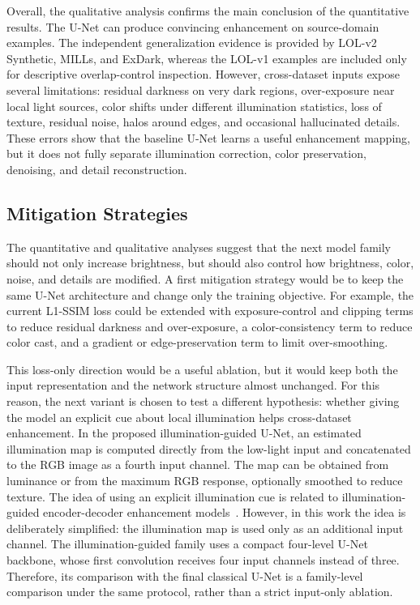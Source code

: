 Overall, the qualitative analysis confirms the main conclusion of the quantitative results. The U-Net can produce convincing enhancement on source-domain examples. The independent generalization evidence is provided by LOL-v2 Synthetic, MILLs, and ExDark, whereas the LOL-v1 examples are included only for descriptive overlap-control inspection. However, cross-dataset inputs expose several limitations: residual darkness on very dark regions, over-exposure near local light sources, color shifts under different illumination statistics, loss of texture, residual noise, halos around edges, and occasional hallucinated details. These errors show that the baseline U-Net learns a useful enhancement mapping, but it does not fully separate illumination correction, color preservation, denoising, and detail reconstruction.

\subsection{Mitigation Strategies}

The quantitative and qualitative analyses suggest that the next model family should not only increase brightness, but should also control how brightness, color, noise, and details are modified. A first mitigation strategy would be to keep the same U-Net architecture and change only the training objective. For example, the current L1-SSIM loss could be extended with exposure-control and clipping terms to reduce residual darkness and over-exposure, a color-consistency term to reduce color cast, and a gradient or edge-preservation term to limit over-smoothing.

This loss-only direction would be a useful ablation, but it would keep both the input representation and the network structure almost unchanged. For this reason, the next variant is chosen to test a different hypothesis: whether giving the model an explicit cue about local illumination helps cross-dataset enhancement. In the proposed illumination-guided U-Net, an estimated illumination map is computed directly from the low-light input and concatenated to the RGB image as a fourth input channel. The map can be obtained from luminance or from the maximum RGB response, optionally smoothed to reduce texture. The idea of using an explicit illumination cue is related to illumination-guided encoder-decoder enhancement models~\cite{DBLP:journals/corr/abs-2507-13360}. However, in this work the idea is deliberately simplified: the illumination map is used only as an additional input channel. The illumination-guided family uses a compact four-level U-Net backbone, whose first convolution receives four input channels instead of three. Therefore, its comparison with the final classical U-Net is a family-level comparison under the same protocol, rather than a strict input-only ablation.

